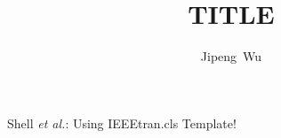 \documentclass[10pt,conference, onecolumn]{IEEEtran}
\begin{document}
\title{ TITLE }
\author{Jipeng~Wu}
%
{Shell \MakeLowercase{\textit{et al.}}: Using IEEEtran.cls Template!}
\maketitle

\section{}
\end{document}
